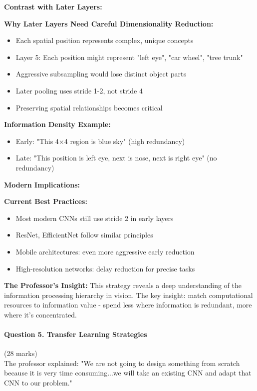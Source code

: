 \documentclass[12pt]{article}
\newcommand{\explanation}[1]{{\color{explanationcolor}#1}}
\begin{document}
\begin{enumerate}[(a)]
{    \textbf{Contrast with Later Layers:}
    
    \explanation{
    \textbf{Why Later Layers Need Careful Dimensionality Reduction:}
    \begin{itemize}
        \item Each spatial position represents complex, unique concepts
        \item Layer 5: Each position might represent "left eye", "car wheel", "tree trunk"
        \item Aggressive subsampling would lose distinct object parts
        \item Later pooling uses stride 1-2, not stride 4
        \item Preserving spatial relationships becomes critical
    \end{itemize}
    
    \textbf{Information Density Example:}
    \begin{itemize}
        \item Early: "This 4×4 region is blue sky" (high redundancy)
        \item Late: "This position is left eye, next is nose, next is right eye" (no redundancy)
    \end{itemize}
    }
    
    \textbf{Modern Implications:}
    
    \explanation{
    \textbf{Current Best Practices:}
    \begin{itemize}
        \item Most modern CNNs still use stride 2 in early layers
        \item ResNet, EfficientNet follow similar principles
        \item Mobile architectures: even more aggressive early reduction
        \item High-resolution networks: delay reduction for precise tasks
    \end{itemize}
    
    \textbf{The Professor's Insight:}
    This strategy reveals a deep understanding of the information processing hierarchy in vision. The key insight: match computational resources to information value - spend less where information is redundant, more where it's concentrated.
    }
    }
\end{enumerate}

\newpage
\paragraph{Question 5. Transfer Learning Strategies}{\hfill (28 marks)}\\
The professor explained: "We are not going to design something from scratch because it is very time consuming...we will take an existing CNN and adapt that CNN to our problem."
\end{document}
